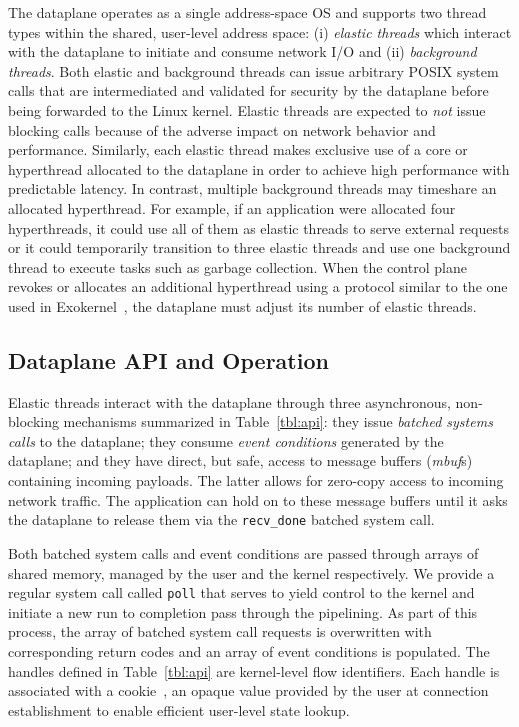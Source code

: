 The \ix dataplane operates as a single address-space OS and supports
two thread types within the shared, user-level address space: (i)
\emph{elastic threads} which interact with the \ix dataplane to
initiate and consume network I/O and (ii) \emph{background threads}.
Both elastic and background threads can issue arbitrary POSIX system
calls that are intermediated and validated for security by the
dataplane before being forwarded to the Linux kernel.  Elastic
threads are expected to \emph{not} issue blocking calls because of the
adverse impact on network behavior and performance. Similarly, each
elastic thread makes exclusive use of a core or hyperthread allocated
to the dataplane in order to achieve high performance with predictable
latency. In contrast, multiple background threads may timeshare an
allocated hyperthread. For example, if an application were
allocated four hyperthreads, it could use all of them as elastic
threads to serve external requests or it could temporarily transition
to three elastic threads and use one background thread to execute
tasks such as garbage collection. When the control plane revokes or
allocates an additional hyperthread using a protocol similar to the
one used in Exokernel~\cite{DBLP:conf/sosp/EnglerKO95}, the dataplane
must adjust its number of elastic threads.


\subsection{Dataplane API and Operation}
\label{sec:impl:kernel}

Elastic threads interact with the \ix dataplane through three
asynchronous, non-blocking mechanisms summarized in
Table~\ref{tbl:api}: they issue \emph{batched systems calls} to the
dataplane; they consume \emph{event conditions} generated by the
dataplane; and they have direct, but safe, access to message buffers
(\emph{mbuf}s) containing incoming payloads.  The latter  allows
for zero-copy access to incoming network traffic.  The application
can hold on to these message buffers until it asks the dataplane to
release them via the \texttt{recv\_done} batched system call.

Both batched system calls and event conditions are passed through
arrays of shared memory, managed by the user and the kernel respectively.
We provide a regular system call called \texttt{poll} that serves
to yield control to the kernel and initiate a new run to completion
pass through the \ix pipelining. As part of this process, the array
of batched system call requests is overwritten with corresponding return
codes and an array of event conditions is populated. The handles
defined in Table~\ref{tbl:api} are kernel-level flow
identifiers. Each handle is associated with a cookie~\cite{han2012megapipe},
an opaque value provided by the user at connection establishment
to enable efficient user-level state lookup. %

